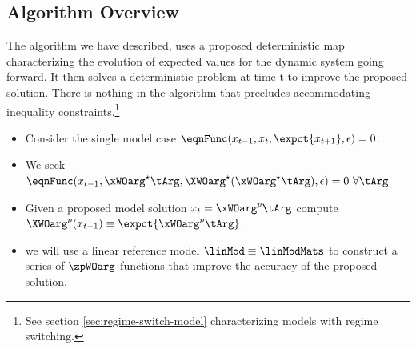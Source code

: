 \documentclass[12pt]{article}
\begin{document}


\subsection{Algorithm Overview}

 \label{sec:unknown-solutions}
The algorithm we have described,
uses a proposed deterministic map
characterizing the evolution of expected values for
the dynamic system going forward. It then solves
a deterministic problem at time t to improve the proposed solution.
There is nothing in the algorithm that precludes accommodating  inequality
constraints.\footnote{See section \ref{sec:regime-switch-model} characterizing
  models with regime switching.}


{
  \begin{itemize}
  \item Consider the single model case $  \eqnFunc(x_{t-1},x_t,\expct{x_{t+1}},\epsilon)=0$.  
\item We seek $\eqnFunc(x_{t-1},\xWOarg^\star\tArg,\XWOarg^\star(\xWOarg^\star\tArg),\epsilon)=0\,\,\forall \tArg $
\item Given a proposed model solution $x_t=\xWOarg^p\tArg$ compute $\XWOarg^p(x_{t-1})\equiv \expct{\xWOarg^p\tArg}$. 
\item we will use a linear reference model $\linMod  \equiv \linModMats$ 
to construct a series of $\zpWOarg$ functions that improve the accuracy of the proposed solution.
\end{itemize}
}
\end{document}
